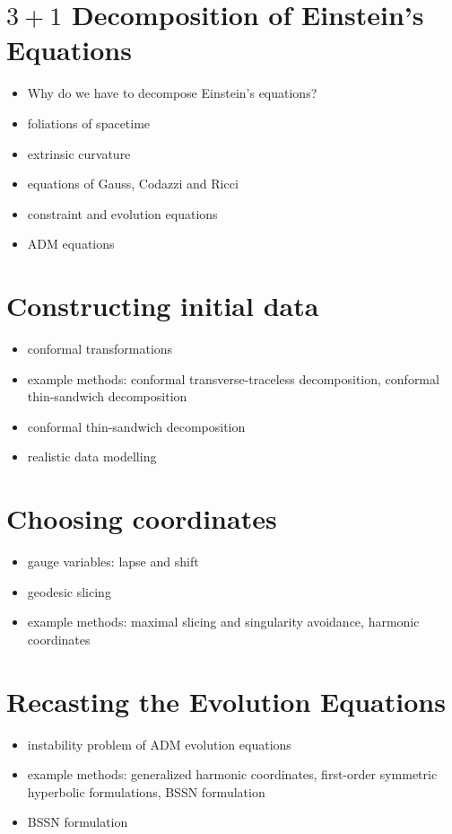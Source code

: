 \documentclass[twocolumn]{article}
\begin{document}
  \section{$3+1$ Decomposition of Einstein's Equations} %
    \begin{itemize}
      \item Why do we have to decompose Einstein's equations?
      \item foliations of spacetime
      \item extrinsic curvature
      \item equations of Gauss, Codazzi and Ricci
      \item constraint and evolution equations
      \item ADM equations
    \end{itemize}

  \section{Constructing initial data} %
  \label{sec:constructing_initial_data}
    \begin{itemize}
      \item conformal transformations
      \item example methods: conformal transverse-traceless decomposition, conformal thin-sandwich decomposition
      \item conformal thin-sandwich decomposition
      \item realistic data modelling
    \end{itemize}

  \section{Choosing coordinates} %
  \label{sec:choosing_coordinates}
    \begin{itemize}
      \item gauge variables: lapse and shift
      \item geodesic slicing
      \item example methods: maximal slicing and singularity avoidance, harmonic coordinates
    \end{itemize}

  \section{Recasting the Evolution Equations} %
  \label{sec:recasting_the_evolution_equations}
    \begin{itemize}
      \item instability problem of ADM evolution equations
      \item example methods: generalized harmonic coordinates, first-order symmetric hyperbolic formulations, BSSN formulation
      \item BSSN formulation
    \end{itemize}
\end{document}
